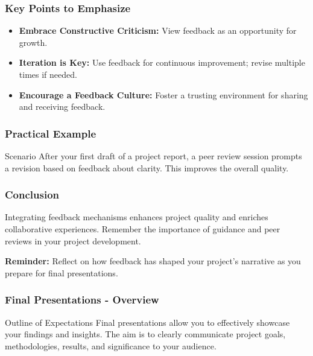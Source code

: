 \documentclass{beamer}
\begin{document}
\begin{frame}[fragile]
    \frametitle{Key Points to Emphasize}
    \begin{itemize}
        \item \textbf{Embrace Constructive Criticism:} View feedback as an opportunity for growth.
        \item \textbf{Iteration is Key:} Use feedback for continuous improvement; revise multiple times if needed.
        \item \textbf{Encourage a Feedback Culture:} Foster a trusting environment for sharing and receiving feedback.
    \end{itemize}
\end{frame}

\begin{frame}[fragile]
    \frametitle{Practical Example}
    \begin{block}{Scenario}
        After your first draft of a project report, a peer review session prompts a revision based on feedback about clarity. This improves the overall quality.
    \end{block}
\end{frame}

\begin{frame}[fragile]
    \frametitle{Conclusion}
    Integrating feedback mechanisms enhances project quality and enriches collaborative experiences. Remember the importance of guidance and peer reviews in your project development.
    
    \textbf{Reminder:} Reflect on how feedback has shaped your project's narrative as you prepare for final presentations.
\end{frame}

\begin{frame}[fragile]
    \frametitle{Final Presentations - Overview}
    \begin{block}{Outline of Expectations}
    Final presentations allow you to effectively showcase your findings and insights. The aim is to clearly communicate project goals, methodologies, results, and significance to your audience.
    \end{block}
\end{frame}
\end{document}
